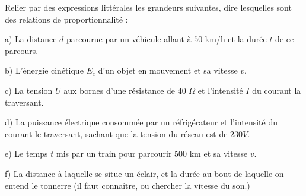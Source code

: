 \documentclass[12 pt]{extarticle}
\theoremstyle{plain}
\begin{document}
Relier par des expressions littérales les grandeurs suivantes, dire lesquelles sont des relations de proportionnalité : 

a) La distance $d$ parcourue par un véhicule allant à $50$ km/h et 
la durée $t$ de ce parcours. 

b) L'énergie cinétique $E_c$ d'un objet en mouvement et sa vitesse $v$. 

c) La tension $U$ aux bornes d'une résistance de 40 $\Omega$ et l'intensité $I$ du courant la traversant.

d) La puissance électrique consommée par un réfrigérateur et l'intensité du courant le traversant, sachant que la tension du réseau est de $230 V$. 

e) Le temps $t$ mis par un train pour parcourir $500$ km et sa vitesse $v$.

f) La distance à laquelle se situe un éclair, et la durée au bout de laquelle on entend le tonnerre (il faut connaître, ou chercher la 
vitesse du son.)





 	
\end{document}
